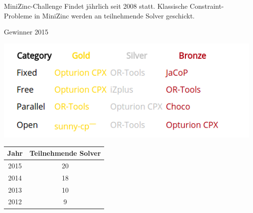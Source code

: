 \begin{frame}{MiniZinc-Challenge}
Findet jährlich seit 2008 statt. Klassische Constraint-Probleme in MiniZinc werden an teilnehmende Solver geschickt.

\begin{center}
Gewinner 2015

\includegraphics[width=.5\textwidth]{img/ergeb2015.png}


\end{center}
\begin{tabular}{|c|c|}
\hline 
Jahr & Teilnehmende Solver \\ 
\hline 
2015 & 20 \\ 
\hline 
2014 & 18 \\ 
\hline 
2013 & 10 \\ 
\hline 
2012 & 9 \\ 
\hline 
\end{tabular} 
\end{frame}